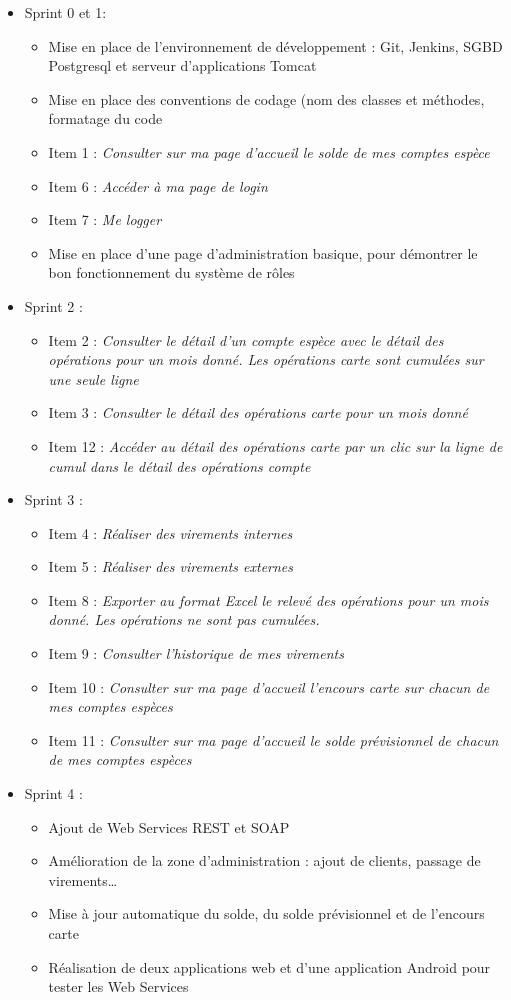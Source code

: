 \begin{itemize}
	\item Sprint 0 et 1:
	\begin{itemize}
		\item Mise en place de l'environnement de développement : Git, Jenkins, SGBD Postgresql et serveur d'applications Tomcat
		\item Mise en place des conventions de codage (nom des classes et méthodes, formatage du code
		 \item Item 1 : \textit{Consulter sur ma page d’accueil le solde de mes comptes espèce}
		 \item Item 6 : \textit{Accéder à ma page de login}
		 \item Item 7 : \textit{Me logger}
		 \item Mise en place d'une page d'administration basique, pour démontrer le bon fonctionnement du système de rôles 
	\end{itemize}
	\item Sprint 2 :
	\begin{itemize}
		\item Item 2 : \textit{Consulter le détail d'un compte espèce avec le détail des opérations pour un mois donné. Les opérations carte sont cumulées sur une seule ligne}
		\item Item 3 : \textit{Consulter le détail des opérations carte pour un mois donné}
		\item Item 12 : \textit{Accéder au détail des opérations carte par un clic sur la ligne de cumul dans le détail des opérations compte}
	\end{itemize}
	\item Sprint 3 : 
	\begin{itemize}
		\item Item 4 : \textit{Réaliser des virements internes}
		\item Item 5 : \textit{Réaliser des virements externes}
		\item Item 8 : \textit{Exporter au format Excel le relevé des opérations pour un mois donné. Les opérations ne sont pas cumulées.}
		\item Item 9 : \textit{Consulter l'historique de mes virements}
		\item Item 10 : \textit{Consulter sur ma page d'accueil l'encours carte sur chacun de mes comptes espèces}
		\item Item 11 : \textit{Consulter sur ma page d'accueil le solde prévisionnel de chacun de mes comptes espèces}
	\end{itemize}
	\item Sprint 4 :
	\begin{itemize}
		\item Ajout de Web Services REST et SOAP
		\item Amélioration de la zone d'administration : ajout de clients, passage de virements\ldots
		\item Mise à jour automatique du solde, du solde prévisionnel et de l'encours carte
		\item Réalisation de deux applications web et d'une application Android pour tester les Web Services
	\end{itemize}
\end{itemize}


